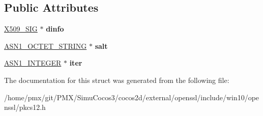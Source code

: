 \subsection*{Public Attributes}
\begin{DoxyCompactItemize}
\item 
\mbox{\label{structPKCS12__MAC__DATA_af1f129d63901a78afc5efe5b7e20ceff}} 
\hyperlink{structX509__sig__st}{X509\+\_\+\+S\+IG} $\ast$ {\bfseries dinfo}
\item 
\mbox{\label{structPKCS12__MAC__DATA_aa20b01b05e8dc10b03a8f49a1c683559}} 
\hyperlink{structasn1__string__st}{A\+S\+N1\+\_\+\+O\+C\+T\+E\+T\+\_\+\+S\+T\+R\+I\+NG} $\ast$ {\bfseries salt}
\item 
\mbox{\label{structPKCS12__MAC__DATA_a7c5060546ea3ebee4d8bf1b087f6e567}} 
\hyperlink{structasn1__string__st}{A\+S\+N1\+\_\+\+I\+N\+T\+E\+G\+ER} $\ast$ {\bfseries iter}
\end{DoxyCompactItemize}


The documentation for this struct was generated from the following file\+:\begin{DoxyCompactItemize}
\item 
/home/pmx/git/\+P\+M\+X/\+Simu\+Cocos3/cocos2d/external/openssl/include/win10/openssl/pkcs12.\+h\end{DoxyCompactItemize}
